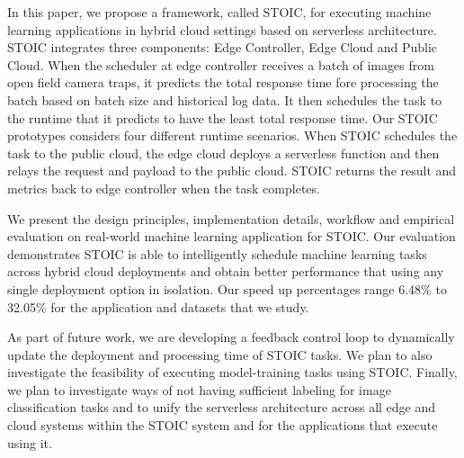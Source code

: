 In this paper, we propose a framework, called STOIC, for executing machine learning applications in hybrid cloud settings based on serverless architecture. STOIC integrates three components: Edge Controller, Edge Cloud and Public Cloud. When the scheduler at edge controller receives a batch of images from open field camera traps, it predicts the total response time fore processing the batch based on batch size and historical log data. It then schedules the task to the runtime that it predicts to have the least total response time.  Our STOIC prototypes
considers four different runtime scenarios. When STOIC schedules the task to the public cloud, the edge cloud deploys a serverless function and then relays the request and payload to the public cloud. STOIC returns the result and metrics back to edge controller when the task completes.

We present the design principles, implementation details, workflow and empirical evaluation on real-world machine learning application for STOIC. Our evaluation demonstrates STOIC is able to intelligently schedule machine learning tasks across hybrid cloud deployments and obtain better performance that using any single deployment option in isolation.  Our speed up percentages range 
6.48\% to 32.05\% for the application and datasets that we study.

As part of future work, we are developing a feedback control loop to dynamically update the deployment and processing time of STOIC tasks. We plan to also investigate the feasibility of executing model-training tasks using STOIC. Finally, we plan to investigate ways of not having sufficient labeling for image
classification tasks and to unify the serverless architecture across
all edge and cloud systems within the STOIC system and for the applications
that execute using it.
